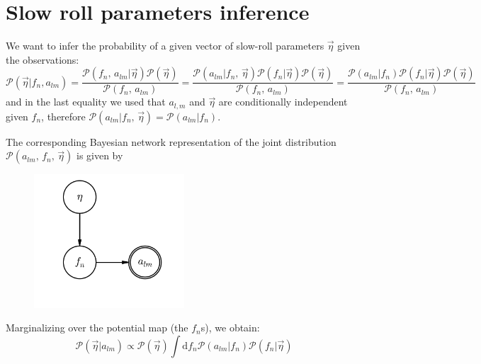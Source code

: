 \documentclass[prd, onecolumn, floatfix, letterpaper, nofootinbib, amsmath, amssymb, superscriptaddress]{revtex4}
\renewcommand{\(}{\left(}
\renewcommand{\)}{\right)}
\renewcommand{\[}{\left[}
\renewcommand{\]}{\right]}
\def\be{\begin{equation}}
\def\ee{\end{equation}}
\begin{document}
 \section{Slow roll parameters inference}
 
 We want to infer the probability of a given vector of slow-roll parameters $\vec{\eta}$ given the observations:
 \be
 	\mathcal{P}(\vec{\eta}| f_n, a_{lm})=\frac{\mathcal{P}( f_n, \, a_{lm}|\vec{\eta})\mathcal{P}(\vec{\eta})}{\mathcal{P}( f_n,\, a_{lm})}=\frac{\mathcal{P}( a_{lm}| f_n,\,\vec{\eta}) \mathcal{P}( f_n|\vec{\eta})\mathcal{P}(\vec{\eta})}{\mathcal{P}( f_n, \, a_{lm})} = \frac{\mathcal{P}( a_{lm}| f_n) \mathcal{P}( f_n|\vec{\eta})\mathcal{P}(\vec{\eta})}{\mathcal{P}( f_n, \, a_{lm})}
 \ee
 and in the last equality we used that $a_{l,m}$ and $\vec{\eta}$ are conditionally independent given $f_n$, therefore $\mathcal{P}( a_{lm}| f_n, \,\vec{\eta})= \mathcal{P}( a_{lm}| f_n)$. 

The corresponding Bayesian network representation of the joint distribution $\mathcal{P}(a_{lm},\,f_n,\,\vec{\eta} )$ is given by

\begin{figure}[h]
\begin{center}
\centering
\includegraphics[width=0.50\textwidth]{pgm/inflation.png}\\
\caption{\label{inflationPGM}
}

\end{center}
\end{figure} 
 Marginalizing over the potential map (the $f_n$s), we obtain:
 \be
 	\mathcal{P}(\vec{\eta}| a_{lm} )\propto\mathcal{P}(\vec{\eta})\int \mathrm{d}f_n\mathcal{P}( a_{lm}| f_n) \mathcal{P}( f_n|\vec{\eta})
 \ee
\end{document}
